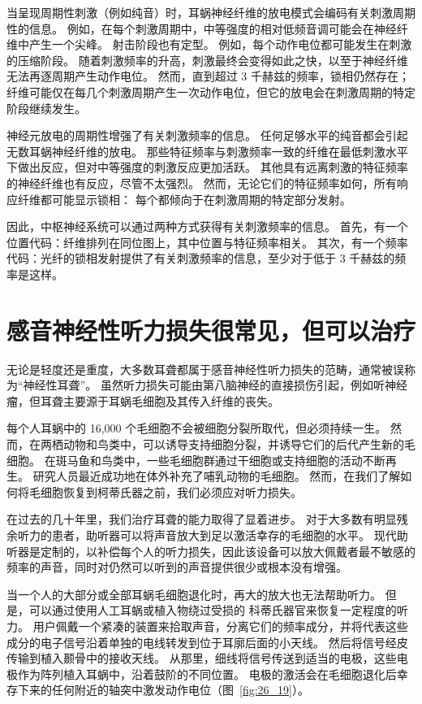 当呈现周期性刺激（例如纯音）时，耳蜗神经纤维的放电模式会编码有关刺激周期性的信息。
例如，在每个刺激周期中，中等强度的相对低频音调可能会在神经纤维中产生一个尖峰。
射击阶段也有定型。
例如，每个动作电位都可能发生在刺激的压缩阶段。
随着刺激频率的升高，刺激最终会变得如此之快，以至于神经纤维无法再逐周期产生动作电位。
然而，直到超过 3 千赫兹的频率，锁相仍然存在；
纤维可能仅在每几个刺激周期产生一次动作电位，但它的放电会在刺激周期的特定阶段继续发生。


神经元放电的周期性增强了有关刺激频率的信息。
任何足够水平的纯音都会引起无数耳蜗神经纤维的放电。
那些特征频率与刺激频率一致的纤维在最低刺激水平下做出反应，但对中等强度的刺激反应更加活跃。
其他具有远离刺激的特征频率的神经纤维也有反应，尽管不太强烈。
然而，无论它们的特征频率如何，所有响应纤维都可能显示锁相：
每个都倾向于在刺激周期的特定部分发射。


因此，中枢神经系统可以通过两种方式获得有关刺激频率的信息。
首先，有一个位置代码：纤维排列在同位图上，其中位置与特征频率相关。
其次，有一个频率代码：光纤的锁相发射提供了有关刺激频率的信息，至少对于低于 3 千赫兹的频率是这样。



\section{感音神经性听力损失很常见，但可以治疗}

无论是轻度还是重度，大多数耳聋都属于感音神经性听力损失的范畴，通常被误称为“神经性耳聋”。
虽然听力损失可能由第八脑神经的直接损伤引起，例如听神经瘤，但耳聋主要源于耳蜗毛细胞及其传入纤维的丧失。


每个人耳蜗中的 16,000 个毛细胞不会被细胞分裂所取代，但必须持续一生。
然而，在两栖动物和鸟类中，可以诱导支持细胞分裂，并诱导它们的后代产生新的毛细胞。
在斑马鱼和鸟类中，一些毛细胞群通过干细胞或支持细胞的活动不断再生。
研究人员最近成功地在体外补充了哺乳动物的毛细胞。 然而，在我们了解如何将毛细胞恢复到柯蒂氏器之前，我们必须应对听力损失。


在过去的几十年里，我们治疗耳聋的能力取得了显着进步。
对于大多数有明显残余听力的患者，助听器可以将声音放大到足以激活幸存的毛细胞的水平。
现代助听器是定制的，以补偿每个人的听力损失，因此该设备可以放大佩戴者最不敏感的频率的声音，同时对仍然可以听到的声音提供很少或根本没有增强。


当一个人的大部分或全部耳蜗毛细胞退化时，再大的放大也无法帮助听力。
但是，可以通过使用人工耳蜗或植入物绕过受损的 科蒂氏器官来恢复一定程度的听力。
用户佩戴一个紧凑的装置来拾取声音，分离它们的频率成分，并将代表这些成分的电子信号沿着单独的电线转发到位于耳廓后面的小天线。
然后将信号经皮传输到植入颞骨中的接收天线。
从那里，细线将信号传送到适当的电极，这些电极作为阵列植入耳蜗中，沿着鼓阶的不同位置。
电极的激活会在毛细胞退化后幸存下来的任何附近的轴突中激发动作电位（图~\ref{fig:26_19}）。


